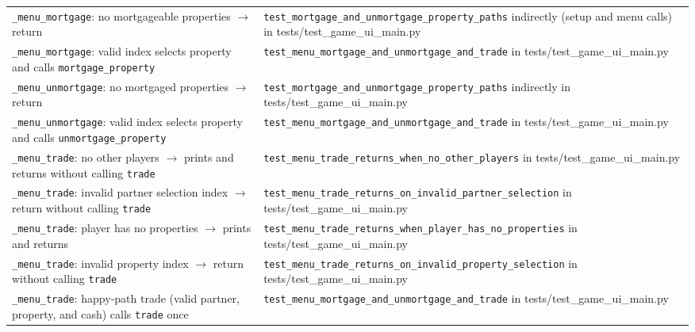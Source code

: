 \documentclass[11pt]{article}
\begin{document}
\begin{longtable}{>{\raggedright\arraybackslash}p{} >{\raggedright\arraybackslash}p{}}
\multicolumn{2}{l}{\textbf{moneypoly.game: \_menu\_mortgage, \_menu\_unmortgage, \_menu\_trade}} \\ \hline
\texttt{\_menu\_mortgage}: no mortgageable properties $\rightarrow$ return & \texttt{test\_mortgage\_and\_unmortgage\_property\_paths} indirectly (setup and menu calls) in tests/test\_game\_ui\_main.py \\ \hline
\texttt{\_menu\_mortgage}: valid index selects property and calls \texttt{mortgage\_property} & \texttt{test\_menu\_mortgage\_and\_unmortgage\_and\_trade} in tests/test\_game\_ui\_main.py \\ \hline
\texttt{\_menu\_unmortgage}: no mortgaged properties $\rightarrow$ return & \texttt{test\_mortgage\_and\_unmortgage\_property\_paths} indirectly in tests/test\_game\_ui\_main.py \\ \hline
\texttt{\_menu\_unmortgage}: valid index selects property and calls \texttt{unmortgage\_property} & \texttt{test\_menu\_mortgage\_and\_unmortgage\_and\_trade} in tests/test\_game\_ui\_main.py \\ \hline
\texttt{\_menu\_trade}: no other players $\rightarrow$ prints and returns without calling \texttt{trade} & \texttt{test\_menu\_trade\_returns\_when\_no\_other\_players} in tests/test\_game\_ui\_main.py \\ \hline
\texttt{\_menu\_trade}: invalid partner selection index $\rightarrow$ return without calling \texttt{trade} & \texttt{test\_menu\_trade\_returns\_on\_invalid\_partner\_selection} in tests/test\_game\_ui\_main.py \\ \hline
\texttt{\_menu\_trade}: player has no properties $\rightarrow$ prints and returns & \texttt{test\_menu\_trade\_returns\_when\_player\_has\_no\_properties} in tests/test\_game\_ui\_main.py \\ \hline
\texttt{\_menu\_trade}: invalid property index $\rightarrow$ return without calling \texttt{trade} & \texttt{test\_menu\_trade\_returns\_on\_invalid\_property\_selection} in tests/test\_game\_ui\_main.py \\ \hline
\texttt{\_menu\_trade}: happy-path trade (valid partner, property, and cash) calls \texttt{trade} once & \texttt{test\_menu\_mortgage\_and\_unmortgage\_and\_trade} in tests/test\_game\_ui\_main.py \\ \hline


\end{longtable}
\end{document}
